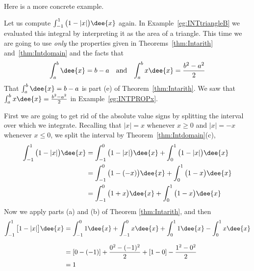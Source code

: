 Here is a more concrete example.
\begin{eg}
Let us compute $\int_{-1}^1 \big(1-|x|\big)\dee{x}$ again. In
Example~\ref{eg:INTtriangleB} we evaluated this integral by interpreting it as
the area of a triangle. This time we are going to use \emph {only} the
properties given in Theorems~\ref{thm:Intarith} and~\ref{thm:Intdomain} and the
facts that
\begin{align*}
\int_a^b \dee{x} &= b-a &\text{and}&&
\int_a^b x\dee{x}=\frac{b^2-a^2}{2}
\end{align*}
That $\int_a^b\dee{x} = b-a$ is part (e) of Theorem~\ref{thm:Intarith}.
We saw that $\int_a^b x\dee{x}=\frac{b^2-a^2}{2}$ in Example~\ref{eg:INTPROPx}.


First we are going to get rid of the absolute value signs by splitting the
interval over which we integrate. Recalling that $|x|=x$ whenever $x\ge 0$ and
$|x|=-x$ whenever $x\le 0$, we split the interval by
Theorem~\ref{thm:Intdomain}(c),
\begin{align*}
\int_{-1}^1 \big(1-|x|\big)\dee{x}
&=\int_{-1}^0 \big(1-|x|\big)\dee{x}
   + \int_0^1 \big(1-|x|\big)\dee{x} \\
&=\int_{-1}^0 \big(1-(-x)\big)\dee{x}
   + \int_0^1 \big(1-x\big)\dee{x} \\
&=\int_{-1}^0 \big(1+x\big)\dee{x}
   + \int_0^1 \big(1-x\big)\dee{x}
\end{align*}
Now we apply parts (a) and (b) of Theorem \ref{thm:Intarith}, and then
\begin{align*}
\int_{-1}^1 \big[1-|x|\big]\dee{x}
&=\int_{-1}^0 1\dee{x}
  + \int_{-1}^0 x\dee{x}
   + \int_0^1 1\dee{x}
   - \int_0^1 x\dee{x} \\[0.1in]
&=[0-(-1)]+\frac{0^2-(-1)^2}{2}+[1-0]-\frac{1^2-0^2}{2} \\
&=1
\end{align*}
\end{eg}

